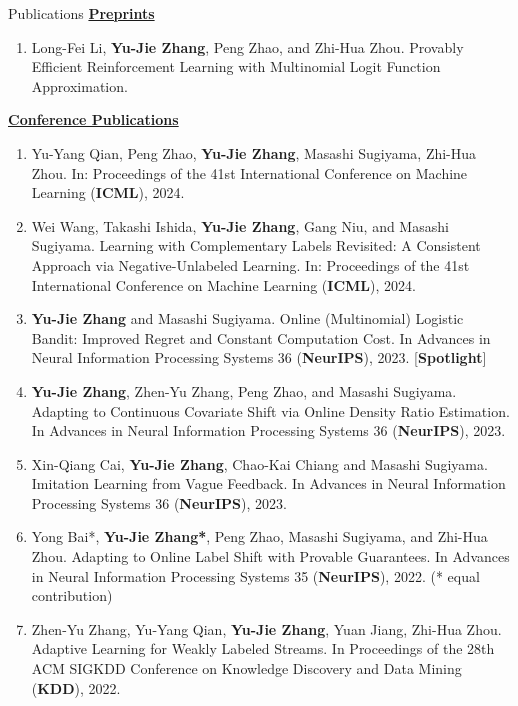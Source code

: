 \documentclass{resume} %
\begin{document}
\begin{rSection}{Publications}
\noindent \underline{\textbf{Preprints}}

\begin{enumerate}[leftmargin= 0.2in]
	\renewcommand*{\labelenumi}{[\theenumi]}
    \item Long-Fei Li, \textbf{Yu-Jie Zhang}, Peng Zhao, and Zhi-Hua Zhou. Provably Efficient Reinforcement Learning with Multinomial Logit Function Approximation. 
\end{enumerate}

\noindent \underline{\textbf{Conference Publications}}
\begin{enumerate}[leftmargin=0.2in]
	\renewcommand*{\labelenumi}{[\theenumi]}
	\setcounter{enumi}{1}
	\item Yu-Yang Qian, Peng Zhao, \textbf{Yu-Jie Zhang}, Masashi Sugiyama, Zhi-Hua Zhou. In: Proceedings of the 41st International Conference on Machine Learning (\textbf{ICML}), 2024.
	\item Wei Wang, Takashi Ishida, \textbf{Yu-Jie Zhang}, Gang Niu, and Masashi Sugiyama. Learning with Complementary Labels Revisited: A Consistent Approach via Negative-Unlabeled Learning. In: Proceedings of the 41st International Conference on Machine Learning (\textbf{ICML}), 2024.		 
	\item \textbf{Yu-Jie Zhang} and Masashi Sugiyama. Online (Multinomial) Logistic Bandit: Improved Regret and Constant Computation Cost. In {Advances in Neural Information Processing Systems 36} (\textbf{NeurIPS}), 2023. {\color{darkred}[\textbf{Spotlight}]}
	\item \textbf{Yu-Jie Zhang}, Zhen-Yu Zhang, Peng Zhao, and Masashi Sugiyama. Adapting to Continuous Covariate Shift via Online Density Ratio Estimation. In {Advances in Neural Information Processing Systems 36} (\textbf{NeurIPS}), 2023.
	\item Xin-Qiang Cai, \textbf{Yu-Jie Zhang}, Chao-Kai Chiang and Masashi Sugiyama. Imitation Learning from Vague Feedback. In {Advances in Neural Information Processing Systems 36} (\textbf{NeurIPS}), 2023.
	\item Yong Bai*, \textbf{Yu-Jie Zhang*}, Peng Zhao, Masashi Sugiyama, and Zhi-Hua Zhou. Adapting to Online Label Shift with Provable Guarantees. In {Advances in Neural Information Processing Systems 35} (\textbf{NeurIPS}), 2022.  (* equal contribution)
	\item Zhen-Yu Zhang, Yu-Yang Qian, \textbf{Yu-Jie Zhang}, Yuan Jiang, Zhi-Hua Zhou. Adaptive Learning for Weakly Labeled Streams. In {Proceedings of the 28th ACM SIGKDD Conference on Knowledge Discovery and Data Mining} (\textbf{KDD}), 2022.

\end{enumerate}
\end{rSection}
\end{document}
